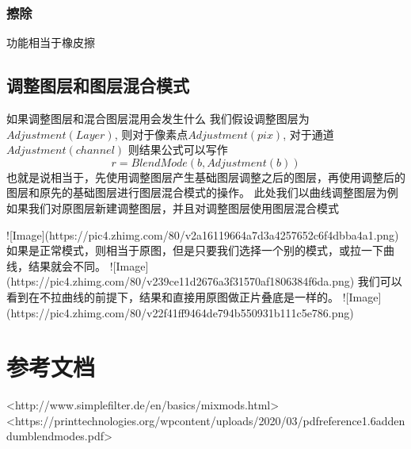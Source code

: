 \subsection{ 擦除}
功能相当于橡皮擦
\section{调整图层和图层混合模式}

如果调整图层和混合图层混用会发生什么
我们假设调整图层为$Adjustment(Layer)$,
则对于像素点$Adjustment(pix)$,
对于通道$Adjustment(channel)$
则结果公式可以写作
$$r=BlendMode(b,Adjustment(b))$$
也就是说相当于，先使用调整图层产生基础图层调整之后的图层，再使用调整后的图层和原先的基础图层进行图层混合模式的操作。
此处我们以曲线调整图层为例
如果我们对原图层新建调整图层，并且对调整图层使用图层混合模式

![Image](https://pic4.zhimg.com/80/v2a16119664a7d3a4257652c6f4dbba4a1.png)
如果是正常模式，则相当于原图，但是只要我们选择一个别的模式，或拉一下曲线，结果就会不同。
![Image](https://pic4.zhimg.com/80/v239ce11d2676a3f31570af1806384f6da.png)
我们可以看到在不拉曲线的前提下，结果和直接用原图做正片叠底是一样的。
![Image](https://pic4.zhimg.com/80/v22f41ff9464de794b550931b111c5e786.png)

\chapter{参考文档}

<http://www.simplefilter.de/en/basics/mixmods.html>
<https://printtechnologies.org/wpcontent/uploads/2020/03/pdfreference1.6addendumblendmodes.pdf>

